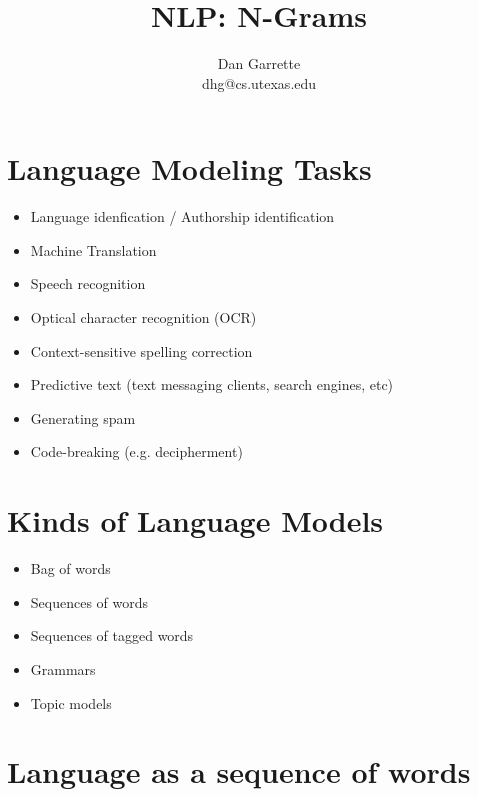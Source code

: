 \documentclass[11pt,letterpaper]{article}
\title{NLP: N-Grams}
\author{Dan Garrette\\\small{dhg@cs.utexas.edu}}
\begin{document}
\maketitle



\section{Language Modeling Tasks}

\begin{itemize}
  \item Language idenfication / Authorship identification
  \item Machine Translation
  \item Speech recognition
  \item Optical character recognition (OCR)
  \item Context-sensitive spelling correction
  \item Predictive text (text messaging clients, search engines, etc)
  \item Generating spam
  \item Code-breaking (e.g. decipherment)
\end{itemize}


\section{Kinds of Language Models}

\begin{itemize}
  \item Bag of words
  \item Sequences of words
  \item Sequences of tagged words
  \item Grammars
  \item Topic models
\end{itemize}


\section{Language as a sequence of words}
\end{document}
